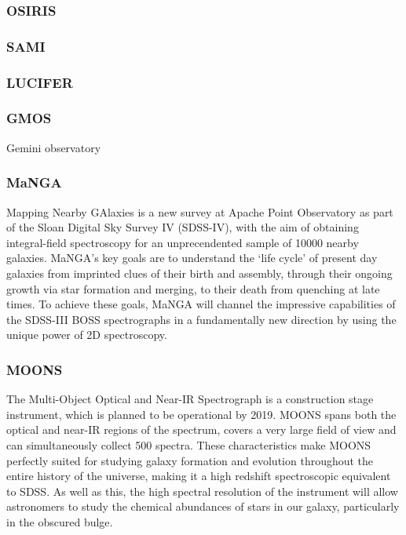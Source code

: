 \documentclass{literature}
\begin{document}
\subsubsection{OSIRIS}\label{subsubsec:OSIRIS}

\subsubsection{SAMI}\label{subsubsec:SAMI}

\subsubsection{LUCIFER}\label{subsubsec:LUCIFER}

\subsubsection{GMOS}
Gemini observatory 

\subsubsection{MaNGA}\label{subsubsec:MaNGA}
Mapping Nearby GAlaxies is a new survey at Apache Point Observatory as part of the Sloan Digital Sky Survey IV (SDSS-IV), with the aim of obtaining integral-field spectroscopy for an unprecendented sample of 10000 nearby galaxies. MaNGA's key goals are to understand the `life cycle' of present day galaxies from imprinted clues of their birth and assembly, through their ongoing growth via star formation and merging, to their death from quenching at late times. To achieve these goals, MaNGA will channel the impressive capabilities of the SDSS-III BOSS spectrographs in a fundamentally new direction by using the unique power of 2D spectroscopy.

\subsubsection{MOONS}\label{subsubsec:MOONS}
The Multi-Object Optical and Near-IR Spectrograph is a construction stage instrument, which is planned to be operational by 2019. MOONS spans both the optical and near-IR regions of the spectrum, covers a very large field of view and can simultaneously collect 500 spectra. These characteristics make MOONS perfectly suited for studying galaxy formation and evolution throughout the entire history of the universe, making it a high redshift spectroscopic equivalent to SDSS. As well as this, the high spectral resolution of the instrument will allow astronomers to study the chemical abundances of stars in our galaxy, particularly in the obscured bulge. 
\end{document}
